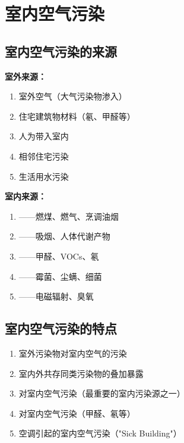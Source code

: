 \section{室内空气污染}

\subsection{室内空气污染的来源}

\begin{keybox}
\textbf{室外来源：}
\begin{enumerate}[leftmargin=*]
    \item 室外空气（大气污染物渗入）
    \item 住宅建筑物材料（氡、甲醛等）
    \item 人为带入室内
    \item 相邻住宅污染
    \item 生活用水污染
\end{enumerate}

\textbf{室内来源：}
\begin{enumerate}[leftmargin=*]
    \item {}——燃煤、燃气、烹调油烟
    \item {}——吸烟、人体代谢产物
    \item {}——甲醛、VOCs、氡
    \item {}——霉菌、尘螨、细菌
    \item {}——电磁辐射、臭氧
\end{enumerate}
\end{keybox}

\subsection{室内空气污染的特点}

\begin{enumerate}[leftmargin=*]
    \item 室外污染物对室内空气的污染
    \item 室内外共存同类污染物的叠加暴露
    \item {}对室内空气污染（最重要的室内污染源之一）
    \item {}对室内空气污染（甲醛、氡等）
    \item 空调引起的室内空气污染（"Sick Building"）
\end{enumerate}

